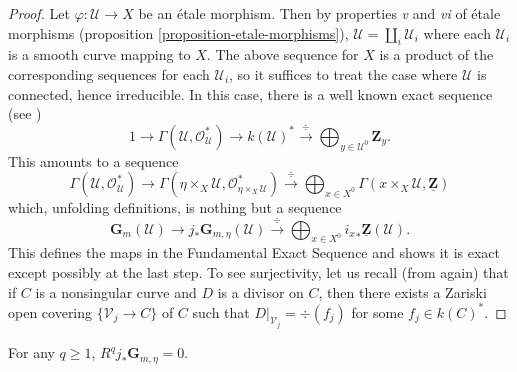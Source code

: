 \begin{proof}
Let $\varphi : \mathcal{U} \to X$ be an \'etale morphism. Then by properties 
{\it v} and {\it vi} of \'etale morphisms (proposition 
\ref{proposition-etale-morphisms}), $\mathcal{U} = \coprod_i \mathcal{U}_i$ where 
each $\mathcal{U}_i$ is a smooth curve mapping to $X$. The above sequence for 
$X$ is a product of the corresponding sequences for each $\mathcal{U}_i$, so it 
suffices to treat the case where $\mathcal{U}$ is connected, hence irreducible. 
In this case, there is a well known exact sequence (see \cite{H})
$$
1 \longrightarrow \Gamma(\mathcal{U},\mathcal{O}_\mathcal{U}^*) \longrightarrow 
k(\mathcal{U})^* \xrightarrow{\ \div\ } \bigoplus_{y \in \mathcal{U}^0} 
\mathbf{Z}_y.
$$
This amounts to a sequence
$$
\Gamma(\mathcal{U},\mathcal{O}_\mathcal{U}^*) \longrightarrow 
\Gamma(\eta\times_X\mathcal{U},\mathcal{O}_{\eta\times_X\mathcal{U}}^*) 
\xrightarrow{\ \div\ } \bigoplus_{x \in X^0} 
\Gamma(x\times_X\mathcal{U},\underline{\mathbf{Z}}) 
$$
which, unfolding definitions, is nothing but a sequence
$$
\mathbf{G}_m(\mathcal{U}) \longrightarrow j_* \mathbf{G}_{m,\eta}(\mathcal{U}) 
\xrightarrow{\ \div\ } \bigoplus_{x \in X^0} {i_x}_* \underline{\mathbf{Z}} 
(\mathcal{U}).
$$
This defines the maps in the Fundamental Exact Sequence and shows it is exact 
except possibly at the last step. To see surjectivity, let us recall (from 
\cite{H} again) that if $C$ is a nonsingular curve and $D$ is a divisor on $C$, 
then there exists a Zariski open covering $\{ \mathcal{V}_j \to C \}$ of $C$ 
such that $D |_{\mathcal{V}_j} = \div(f_j)$ for some $f_j \in k(C)^*$.
\end{proof}

\begin{lemma}
For any $q \geq 1$, $R^q j_*\mathbf{G}_{m,\eta} = 0$.
\end{lemma}

